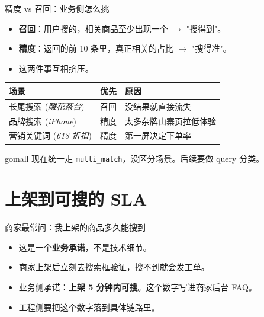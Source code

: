 \begin{frame}{精度 vs 召回：业务侧怎么挑}
\begin{itemize}
  \item \textbf{召回}：用户搜的，相关商品至少出现一个 $\to$ "搜得到"。
  \item \textbf{精度}：返回的前 10 条里，真正相关的占比 $\to$ "搜得准"。
  \item 这两件事互相挤压。
\end{itemize}
\vspace{2mm}
\begin{tabular}{@{}lll@{}}
\toprule
场景    & 优先 & 原因 \\
\midrule
长尾搜索 (\textit{雕花茶台}) & 召回 & 没结果就直接流失 \\
品牌搜索 (\textit{iPhone}) & 精度 & 太多杂牌山寨页拉低体验 \\
营销关键词 (\textit{618 折扣}) & 精度 & 第一屏决定下单率 \\
\bottomrule
\end{tabular}
\vspace{2mm}
\small gomall 现在统一走 \texttt{multi\_match}，没区分场景。后续要做 query 分类。
\end{frame}

\section{上架到可搜的 SLA}

\begin{frame}{商家最常问：我上架的商品多久能搜到}
\begin{itemize}
  \item 这是一个\textbf{业务承诺}，不是技术细节。
  \item 商家上架后立刻去搜索框验证，搜不到就会发工单。
  \item 业务侧承诺：\textbf{上架 5 分钟内可搜}。这个数字写进商家后台 FAQ。
  \item 工程侧要把这个数字落到具体链路里。
\end{itemize}
\vspace{3mm}
\end{frame}

